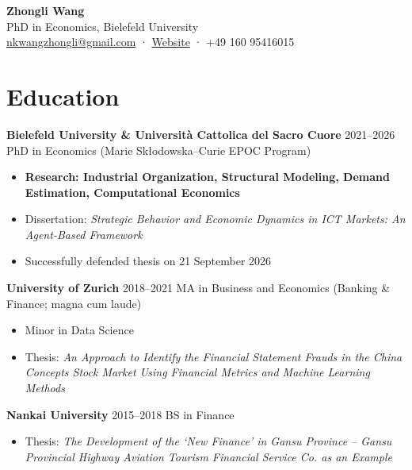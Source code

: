\documentclass[a4paper,11pt]{article}
\begin{document}
\begin{center}
{\LARGE \textbf{Zhongli Wang}}\\[4pt]
PhD in Economics, Bielefeld University\\
\href{mailto:nkwangzhongli@gmail.com}{nkwangzhongli@gmail.com} · 
\href{https://sites.google.com/view/zhongli-wang}{Website} · 
+49 160 95416015
\end{center}

\section{Education}

\textbf{Bielefeld University \& Università Cattolica del Sacro Cuore} \hfill 2021–2026  
\newline PhD in Economics (Marie Skłodowska–Curie EPOC Program)  
\begin{itemize}
\item \textbf{Research: Industrial Organization, Structural Modeling, Demand Estimation, Computational Economics}  
\item Dissertation: \emph{Strategic Behavior and Economic Dynamics in ICT Markets: An Agent-Based Framework}  
\item Successfully defended thesis on 21 September 2026  
\end{itemize}

\textbf{University of Zurich} \hfill 2018–2021  
\newline MA in Business and Economics (Banking \& Finance; magna cum laude)  
\begin{itemize}
\item Minor in Data Science  
\item Thesis: \textit{An Approach to Identify the Financial Statement Frauds in the China Concepts Stock Market Using Financial Metrics and Machine Learning Methods}   
\end{itemize}

\textbf{Nankai University} \hfill 2015–2018  
\newline BS in Finance  
\begin{itemize}
    \item Thesis: \textit{The Development of the `New Finance' in Gansu Province – Gansu Provincial Highway Aviation Tourism Financial Service Co. as an Example}
\end{itemize}
\end{document}
